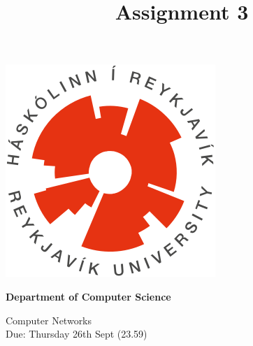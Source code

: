 \documentclass[9pt, addpoints]{exam}
\title{Assignment 3}
\begin{document}
\noindent
\begin{minipage}[l]{.11\textwidth}%
\noindent
   \includegraphics[width=\textwidth]{RU.png}
\end{minipage}%
\begin{minipage}[r]{.6\textwidth}%
\begin{center}
    {\large\bfseries Department of Computer Science \par
    \large Computer Networks \\[2pt]
    \large Due: Thursday 26th Sept (23.59)
    }
\end{center}
\end{minipage}%
%
\end{document}
